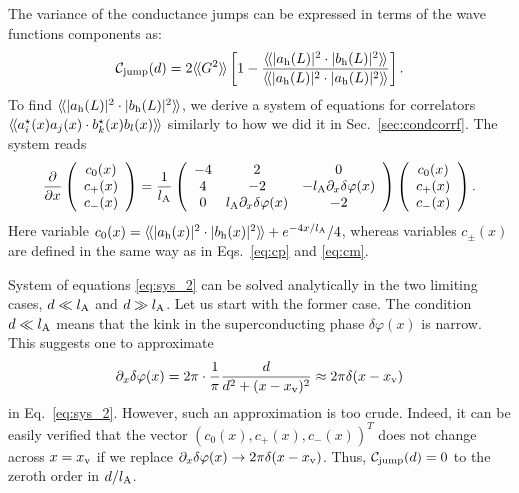 \documentclass[pra,aps,a4paper,twocolumn,superscriptaddress,longbibliography]{revtex4-2}
\newcommand{\rngl}{\rangle\hspace{-0.05cm}\rangle}
\newcommand{\lngl}{\langle\hspace{-0.05cm}\langle}
\newcommand{\lprox}{L}
\newcommand{\lA}{l_{\rm A}}
\begin{document}
The variance of the conductance jumps can be expressed in terms of the wave functions components as:
\begin{equation}\label{eq:jump_def}
    {\cal C}_{\rm jump}(d) = 2 \lngl G^2 \rngl \left[1 - \frac{\lngl |a_{\rm h}(\lprox)|^2 \cdot |b_{\rm h}(\lprox)|^2\rngl}{\lngl |a_{\rm h}(\lprox)|^2 \cdot |a_{\rm h}(\lprox)|^2\rngl}
\right].
\end{equation}
To find $\lngl |a_{\rm h}(\lprox)|^2 \cdot |b_{\rm h}(\lprox)|^2\rngl$, we derive a system of equations for correlators $\lngl a_i^\star(x) a_j(x) \cdot b_k^\star(x) b_l(x) \rngl$ similarly to how we did it in Sec.~\ref{sec:condcorrf}. The system reads
\begin{equation}\label{eq:sys_2}
    \frac{\partial}{\partial x}\left(\begin{array}{c}
c_0(x)\\
c_+(x)\\
c_-(x)
\end{array}\right)
=
\frac{1}{l_{\rm A}}\left(\begin{array}{ccc}
-4  & 2 & 0\\
4 & -2  & -\lA \partial_x \delta \varphi(x) \\
0 & \lA \partial_x \delta \varphi(x) & -2 
\end{array}\right)\left(\begin{array}{c}
c_0(x)\\
c_+(x)\\
c_-(x)
\end{array}\right).
\end{equation}
Here variable $c_{0}(x) = \lngl |a_{\rm h}(x)|^2 \cdot |b_{\rm h}(x)|^2 \rngl + e^{-4 x / \lA} / 4$, whereas variables $c_\pm (x)$ are defined in the same way as in Eqs.~\eqref{eq:cp} and \eqref{eq:cm}. 

System of equations \eqref{eq:sys_2} can be solved analytically in the two limiting cases, $d \ll \lA$ and $d \gg \lA$. Let us start with the former case. The condition $d \ll \lA$ means that the kink in the superconducting phase $\delta \varphi(x)$ is narrow. This suggests one to approximate
\begin{equation}\label{eq:deltaappr}
    \partial_x \delta \varphi(x) = 2\pi\cdot  \frac{1}{\pi}\frac{d}{d^2 + (x - x_{\rm v})^2}\approx 2\pi \delta (x - x_{\rm v})
\end{equation}
in Eq.~\eqref{eq:sys_2}.
However, such an approximation is too crude. Indeed, it can be easily verified that the vector $(c_0(x),c_+(x),c_-(x))^T$ does not change across $x = x_{\rm v}$ if we replace $\partial_x \delta \varphi(x) \rightarrow 2\pi \delta (x - x_{\rm v})$. 
Thus, ${\cal C}_{\rm jump}(d)=0$ to the zeroth order in $d / \lA$.
\end{document}
